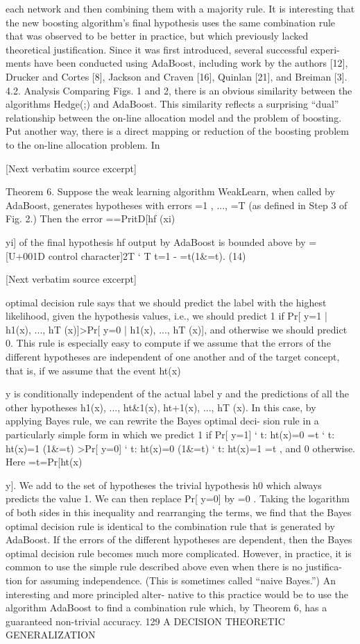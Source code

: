 \documentclass[10pt]{article}
\begin{document}
\begin{ReviewVerbatim}
{each network and then combining them with a majority
rule. It is interesting that the new boosting algorithm's
final hypothesis uses the same combination rule that was
observed to be better in practice, but which previously
lacked theoretical justification.
Since it was first introduced, several successful experi-
ments have been conducted using AdaBoost, including work
by the authors [12], Drucker and Cortes [8], Jackson and
Craven [16], Quinlan [21], and Breiman [3].
4.2. Analysis
Comparing Figs. 1 and 2, there is an obvious similarity
between the algorithms Hedge(;) and AdaBoost. This
similarity reflects a surprising ``dual'' relationship between
the on-line allocation model and the problem of boosting.
Put another way, there is a direct mapping or reduction of
the boosting problem to the on-line allocation problem. In

[Next verbatim source excerpt]

Theorem 6. Suppose the weak learning algorithm
WeakLearn, when called by AdaBoost, generates hypotheses
with errors =1 , ..., =T (as defined in Step 3 of Fig. 2.) Then the
error ==PritD[hf (xi){ yi] of the final hypothesis hf output
by AdaBoost is bounded above by
=[U+001D control character]2T
`
T
t=1
- =t(1&=t). (14)

[Next verbatim source excerpt]

optimal decision rule says that we should predict the label
with the highest likelihood, given the hypothesis values, i.e.,
we should predict 1 if
Pr[ y=1 | h1(x), ..., hT (x)]>Pr[ y=0 | h1(x), ..., hT (x)],
and otherwise we should predict 0.
This rule is especially easy to compute if we assume that
the errors of the different hypotheses are independent of one
another and of the target concept, that is, if we assume that
the event ht(x){ y is conditionally independent of the
actual label y and the predictions of all the other hypotheses
h1(x), ..., ht&1(x), ht+1(x), ..., hT (x). In this case, by
applying Bayes rule, we can rewrite the Bayes optimal deci-
sion rule in a particularly simple form in which we predict
1 if
Pr[ y=1] `
t: ht(x)=0
=t `
t: ht(x)=1
(1&=t)
>Pr[ y=0] `
t: ht(x)=0
(1&=t) `
t: ht(x)=1
=t ,
and 0 otherwise. Here =t=Pr[ht(x){ y]. We add to the set
of hypotheses the trivial hypothesis h0 which always
predicts the value 1. We can then replace Pr[ y=0] by =0 .
Taking the logarithm of both sides in this inequality and
rearranging the terms, we find that the Bayes optimal
decision rule is identical to the combination rule that is
generated by AdaBoost.
If the errors of the different hypotheses are dependent,
then the Bayes optimal decision rule becomes much more
complicated. However, in practice, it is common to use the
simple rule described above even when there is no justifica-
tion for assuming independence. (This is sometimes called
``naive Bayes.'') An interesting and more principled alter-
native to this practice would be to use the algorithm
AdaBoost to find a combination rule which, by Theorem 6,
has a guaranteed non-trivial accuracy.
129
A DECISION THEORETIC GENERALIZATION

}}}}
\end{ReviewVerbatim}
\end{document}
